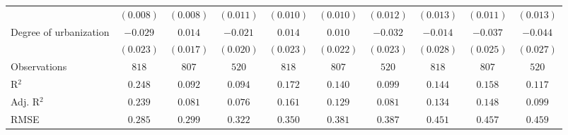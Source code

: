 \begin{center}
\begin{small}
\begin{longtable}{l@{} c@{} c@{} c@{} c@{} c@{} c@{} c@{} c@{} c@{}}
                                    & $(0.008)$       & $(0.008)$       & $(0.011)$       & $(0.010)$        & $(0.010)$     & $(0.012)$        & $(0.013)$        & $(0.011)$        & $(0.013)$        \\
\quad Degree of urbanization        & $-0.029$        & $0.014$         & $-0.021$        & $0.014$          & $0.010$       & $-0.032$         & $-0.014$         & $-0.037$         & $-0.044$         \\
                                    & $(0.023)$       & $(0.017)$       & $(0.020)$       & $(0.023)$        & $(0.022)$     & $(0.023)$        & $(0.028)$        & $(0.025)$        & $(0.027)$        \\
\hline
Observations                        & $818$           & $807$           & $520$           & $818$            & $807$         & $520$            & $818$            & $807$            & $520$            \\
R$^2$                               & $0.248$         & $0.092$         & $0.094$         & $0.172$          & $0.140$       & $0.099$          & $0.144$          & $0.158$          & $0.117$          \\
Adj. R$^2$                          & $0.239$         & $0.081$         & $0.076$         & $0.161$          & $0.129$       & $0.081$          & $0.134$          & $0.148$          & $0.099$          \\
RMSE                                & $0.285$         & $0.299$         & $0.322$         & $0.350$          & $0.381$       & $0.387$          & $0.451$          & $0.457$          & $0.459$          \\
\end{longtable}
\end{small}
\end{center}
